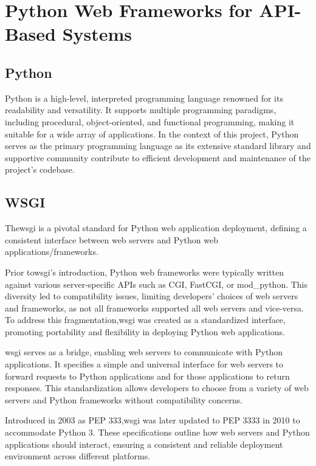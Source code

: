 \section{Python Web Frameworks for API-Based Systems}

  \subsection{Python}
    Python is a high-level, interpreted programming language renowned for its readability and versatility. It supports 
    multiple programming paradigms, including procedural, object-oriented, and functional programming, making it suitable 
    for a wide array of applications.
    In the context of this project, Python serves as the primary programming language as its extensive standard library 
    and supportive community contribute to efficient development and maintenance of the project's codebase.

  \subsection{WSGI}
    The\ac{wsgi} is a pivotal standard for Python web application deployment, defining a consistent interface between web 
    servers and Python web applications/frameworks.

    Prior to\ac{wsgi}'s introduction\cite{pep333}, Python web frameworks were typically written against various server-specific APIs such as 
    CGI, FastCGI, or mod\_python. This diversity led to compatibility issues, limiting developers' choices of web servers and 
    frameworks, as not all frameworks supported all web servers and vice-versa. To address this fragmentation,\ac{wsgi} was 
    created as a standardized interface, promoting portability and flexibility in deploying Python web applications. 

    \ac{wsgi} serves as a bridge, enabling web servers to communicate with Python applications. It specifies a simple and universal 
    interface for web servers to forward requests to Python applications and for those applications to return responses. 
    This standardization allows developers to choose from a variety of web servers and Python frameworks without compatibility 
    concerns.

    Introduced in 2003 as PEP 333,\ac{wsgi} was later updated to PEP 3333 in 2010 to accommodate Python 3. These specifications 
    outline how web servers and Python applications should interact, ensuring a consistent and reliable deployment environment 
    across different platforms.

